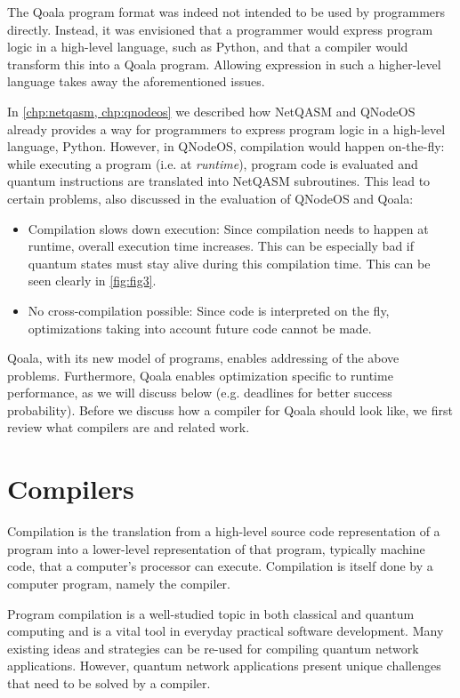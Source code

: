 The Qoala program format was indeed not intended to be used by programmers directly.
Instead, it was envisioned that a programmer would express program logic in a high-level language, such as Python, and that a compiler would transform this into a Qoala program.
Allowing expression in such a higher-level language takes away the aforementioned issues.


In \cref{chp:netqasm, chp:qnodeos} we described how NetQASM and QNodeOS already provides a way for programmers to express program logic in a high-level language, Python.
However, in QNodeOS, compilation would happen on-the-fly:
while executing a program (i.e. at \emph{runtime}), program code is evaluated and quantum instructions are translated into NetQASM subroutines.
This lead to certain problems, also discussed in the evaluation of QNodeOS and Qoala:
\begin{itemize}
  \item Compilation slows down execution:
    Since compilation needs to happen at runtime, overall execution time increases.
    This can be especially bad if quantum states must stay alive during this compilation time.
    This can be seen clearly in \cref{fig:fig3}.
  \item No cross-compilation possible:
    Since code is interpreted on the fly, optimizations taking into account future code cannot be made. 
\end{itemize}

Qoala, with its new model of programs, enables addressing of the above problems.
Furthermore, Qoala enables optimization specific to runtime performance, as we will discuss below (e.g. deadlines for better success probability).
Before we discuss how a compiler for Qoala should look like, we first review what compilers are and related work.


\section{Compilers}
Compilation is the translation from a high-level source code representation of a program into a lower-level representation of that program, typically machine code, that a computer's processor can execute.
Compilation is itself done by a computer program, namely the compiler.

Program compilation is a well-studied topic in both classical and quantum computing and is a vital tool in everyday practical software development.
Many existing ideas and strategies can be re-used for compiling quantum network applications.
However, quantum network applications present unique challenges that need to be solved by a compiler.

